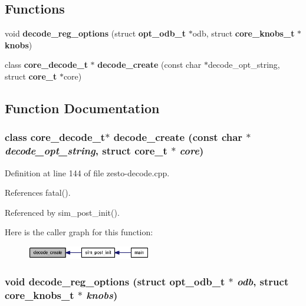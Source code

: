 \subsection*{Functions}
\begin{CompactItemize}
\item 
void {\bf decode\_\-reg\_\-options} (struct {\bf opt\_\-odb\_\-t} $\ast$odb, struct {\bf core\_\-knobs\_\-t} $\ast${\bf knobs})
\item 
class {\bf core\_\-decode\_\-t} $\ast$ {\bf decode\_\-create} (const char $\ast$decode\_\-opt\_\-string, struct {\bf core\_\-t} $\ast$core)
\end{CompactItemize}


\subsection{Function Documentation}
\subsubsection[{decode\_\-create}]{\setlength{\rightskip}{0pt plus 5cm}class {\bf core\_\-decode\_\-t}$\ast$ decode\_\-create (const char $\ast$ {\em decode\_\-opt\_\-string}, \/  struct {\bf core\_\-t} $\ast$ {\em core})}\label{zesto-decode_8cpp_4fc719f96861588f24dd802be6e2b0df}




Definition at line 144 of file zesto-decode.cpp.

References fatal().

Referenced by sim\_\-post\_\-init().

Here is the caller graph for this function:\nopagebreak
\begin{figure}[H]
\begin{center}
\leavevmode
\includegraphics[width=154pt]{zesto-decode_8cpp_4fc719f96861588f24dd802be6e2b0df_icgraph}
\end{center}
\end{figure}
\subsubsection[{decode\_\-reg\_\-options}]{\setlength{\rightskip}{0pt plus 5cm}void decode\_\-reg\_\-options (struct {\bf opt\_\-odb\_\-t} $\ast$ {\em odb}, \/  struct {\bf core\_\-knobs\_\-t} $\ast$ {\em knobs})}\label{zesto-decode_8cpp_22a8e8da3f62458e0ed1dd350cec4ae7}




